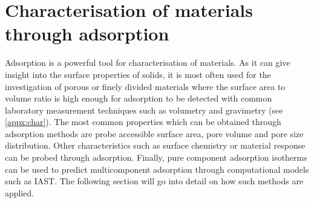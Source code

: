 
\section{Characterisation of materials through adsorption}

Adsorption is a powerful tool for characterisation of materials.
As it can give insight into the surface properties of solids, it
is most often used for the investigation of porous or finely
divided materials where the surface area to volume ratio is
high enough for adsorption to be detected with common laboratory
measurement techniques such as volumetry and gravimetry (see
\autoref{appx:char}). The most common properties which can
be obtained through adsorption methods are probe accessible
surface area, pore volume and pore size distribution. Other
characteristics such as surface chemistry or material response
can be probed through adsorption. Finally, pure component adsorption
isotherms can be used to predict multicomponent adsorption through
computational models such as IAST. The following section will go into
detail on how such methods are applied.



